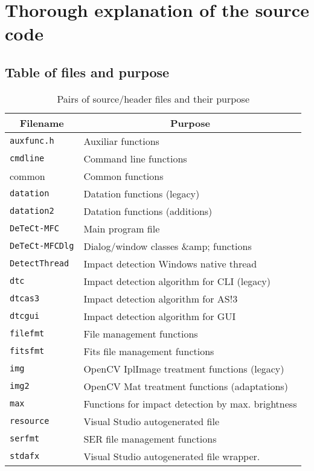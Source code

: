 \documentclass[a4paper,11pt]{memoir}
\begin{document}
\section{Thorough explanation of the source code}

\subsection{Table of files and purpose}

\begin{table}[H]
\centering
\caption{Pairs of source/header files and their purpose}
\label{my-label}
\begin{tabular}{|m{}|m{}|}
\hline
\multicolumn{1}{|c|}{\textbf{Filename}} & \multicolumn{1}{c|}{\textbf{Purpose}} \\ \hline
\texttt{auxfunc.h} & Auxiliar functions \\ \hline
\texttt{cmdline} & Command line functions   \\ \hline
common & Common functions   \\ \hline
\texttt{datation} & Datation functions (legacy)   \\ \hline
\texttt{datation2} & Datation functions (additions)   \\ \hline
\texttt{DeTeCt-MFC} & Main program file  \\ \hline
\texttt{DeTeCt-MFCDlg} & Dialog/window classes \&amp; functions  \\ \hline
\texttt{DetectThread} & Impact detection  Windows native thread \\ \hline
\texttt{dtc} & Impact detection algorithm for CLI (legacy) \\ \hline
\texttt{dtcas3} & Impact detection algorithm for AS!3  \\ \hline
\texttt{dtcgui} & Impact detection algorithm for GUI  \\ \hline
\texttt{filefmt} & File management functions  \\ \hline
\texttt{fitsfmt} & Fits file management functions  \\ \hline
\texttt{img} & OpenCV IplImage treatment functions (legacy)  \\ \hline
\texttt{img2} & OpenCV Mat treatment functions (adaptations)  \\ \hline
\texttt{max} & Functions for impact detection by max. brightness \\ \hline
\texttt{resource} & Visual Studio autogenerated file  \\ \hline
\texttt{serfmt} & SER file management functions  \\ \hline
\texttt{stdafx} & Visual Studio autogenerated file wrapper. \\ \hline
\end{tabular}
\end{table}
\end{document}
